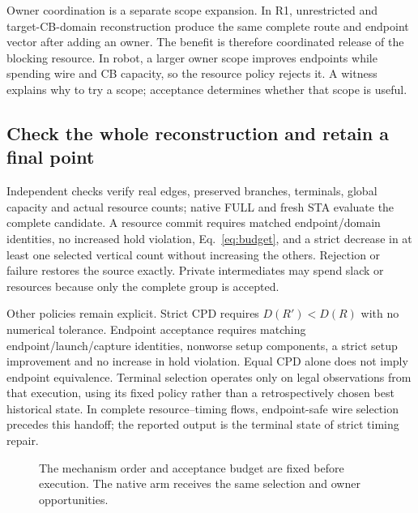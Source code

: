 \documentclass[conference,10pt]{IEEEtran}
\begin{document}
Owner coordination is a separate scope expansion. In R1, unrestricted and target-CB-domain reconstruction produce the same complete route and endpoint vector after adding an owner. The benefit is therefore coordinated release of the blocking resource. In robot, a larger owner scope improves endpoints while spending wire and CB capacity, so the resource policy rejects it. A witness explains why to try a scope; acceptance determines whether that scope is useful.

\subsection{Check the whole reconstruction and retain a final point}
Independent checks verify real edges, preserved branches, terminals, global capacity and actual resource counts; native FULL and fresh STA evaluate the complete candidate. A resource commit requires matched endpoint/domain identities, no increased hold violation, Eq.~\ref{eq:budget}, and a strict decrease in at least one selected vertical count without increasing the others. Rejection or failure restores the source exactly. Private intermediates may spend slack or resources because only the complete group is accepted.

Other policies remain explicit. Strict CPD requires $D(R')<D(R)$ with no numerical tolerance. Endpoint acceptance requires matching endpoint/launch/capture identities, nonworse setup components, a strict setup improvement and no increase in hold violation. Equal CPD alone does not imply endpoint equivalence. Terminal selection operates only on legal observations from that execution, using its fixed policy rather than a retrospectively chosen best historical state. In complete resource--timing flows, endpoint-safe wire selection precedes this handoff; the reported output is the terminal state of strict timing repair.

\begin{figure}[t]
\centering\footnotesize
{}
\caption{The mechanism order and acceptance budget are fixed before execution. The native arm receives the same selection and owner opportunities.}
\label{fig:algorithm}
\end{figure}
\end{document}
